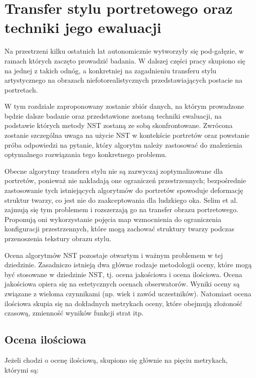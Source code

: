 \documentclass[12pt]{article}
\begin{document}
\section{Transfer stylu portretowego oraz techniki jego ewaluacji}

\indent

Na przestrzeni kilku ostatnich lat autonomicznie wytworzyły się pod-gałęzie, w ramach których zaczęto prowadzić badania. W dalszej części pracy skupiono się na jednej z takich odnóg, a konkretniej na zagadnieniu transferu stylu artystycznego na obrazach niefotorealistycznych przedstawiających postacie na portretach.

W tym rozdziale zaproponowany zostanie zbiór danych, na którym prowadzone będzie dalsze badanie oraz przedstawione zostaną techniki ewaluacji, na podstawie których metody NST zostaną ze sobą skonfrontowane. Zwrócona zostanie szczególna uwaga na użycie NST w kontekście portretów oraz powstanie próba odpowiedzi na pytanie, który algorytm należy zastosować do znalezienia optymalnego rozwiązania tego konkretnego problemu.

Obecne algorytmy transferu stylu nie są zazwyczaj zoptymalizowane dla portretów, ponieważ nie nakładają one ograniczeń przestrzennych; bezpośrednie zastosowanie tych istniejących algorytmów do portretów spowoduje deformację struktur twarzy, co jest nie do zaakceptowania dla ludzkiego oka. Selim et al. \cite{56} zajmują się tym problemem i rozszerzają go \cite{29} na transfer obrazu portretowego. Proponują oni wykorzystanie pojęcia map wzmocnienia do ograniczenia konfiguracji przestrzennych, które mogą zachować struktury twarzy podczas przenoszenia tekstury obrazu stylu.

Ocena algorytmów NST pozostaje otwartym i ważnym problemem w tej dziedzinie. Zasadniczo istnieją dwa główne rodzaje metodologii oceny, które mogą być stosowane w dziedzinie NST, tj. ocena jakościowa i ocena ilościowa. Ocena jakościowa opiera się na estetycznych ocenach obserwatorów. Wyniki oceny są związane z wieloma czynnikami (np. wiek i zawód uczestników). Natomiast ocena ilościowa skupia się na dokładnych metrykach oceny, które obejmują złożoność czasową, zmienność wyników funkcji strat itp.

\subsection{Ocena ilościowa}

\indent

Jeżeli chodzi o ocenę ilościową, skupiono się głównie na pięciu metrykach, którymi są:
\end{document}
